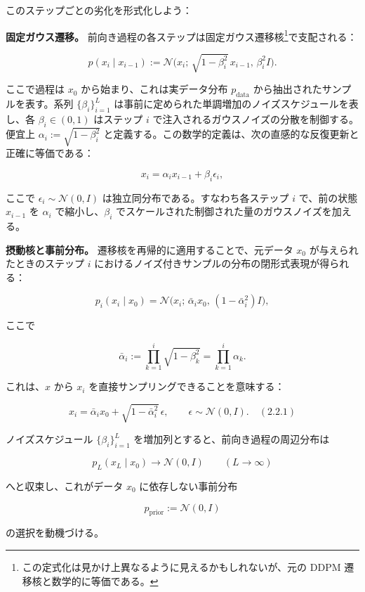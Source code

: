 このステップごとの劣化を形式化しよう：



\textbf{固定ガウス遷移。} 前向き過程の各ステップは固定ガウス遷移核\footnote{この定式化は見かけ上異なるように見えるかもしれないが、元の DDPM 遷移核と数学的に等価である。}で支配される：

\[
p(x_i\mid x_{i-1}) := \mathcal{N}\bigl(x_i;\, \sqrt{1-\beta_i^2}\, x_{i-1},\, \beta_i^2 I\bigr).
\]


ここで過程は $x_0$ から始まり、これは実データ分布 $p_{\mathrm{data}}$ から抽出されたサンプルを表す。系列 $\{\beta_i\}_{i=1}^{L}$ は事前に定められた単調増加のノイズスケジュールを表し、各 $\beta_i \in (0,1)$ はステップ $i$ で注入されるガウスノイズの分散を制御する。便宜上 $\alpha_i := \sqrt{1-\beta_i^2}$ と定義する。この数学的定義は、次の直感的な反復更新と正確に等価である：

\[
x_i = \alpha_i x_{i-1} + \beta_i \epsilon_i,
\]


ここで $\epsilon_i \sim \mathcal{N}(0,I)$ は独立同分布である。すなわち各ステップ $i$ で、前の状態 $x_{i-1}$ を $\alpha_i$ で縮小し、$\beta_i$ でスケールされた制御された量のガウスノイズを加える。

\textbf{摂動核と事前分布。} 遷移核を再帰的に適用することで、元データ $x_0$ が与えられたときのステップ $i$ におけるノイズ付きサンプルの分布の閉形式表現が得られる：

\[
p_i(x_i\mid x_0) = \mathcal{N}\bigl(x_i;\, \bar{\alpha}_i x_0,\, (1-\bar{\alpha}_i^2)I\bigr),
\]


ここで

\[
\bar{\alpha}_i := \prod_{k=1}^{i}\sqrt{1-\beta_k^2} = \prod_{k=1}^{i}\alpha_k.
\]


これは、$x$ から $x_i$ を直接サンプリングできることを意味する：

\[
x_i = \bar{\alpha}_i x_0 + \sqrt{1-\bar{\alpha}_i^2}\,\epsilon, \qquad \epsilon\sim\mathcal{N}(0,I). \quad (2.2.1)
\]


ノイズスケジュール $\{\beta_i\}_{i=1}^{L}$ を増加列とすると、前向き過程の周辺分布は

\[
p_L(x_L\mid x_0) \longrightarrow \mathcal{N}(0,I) \qquad (L\to\infty)
\]


へと収束し、これがデータ $x_0$ に依存しない事前分布

\[
p_{\mathrm{prior}} := \mathcal{N}(0,I)
\]


の選択を動機づける。


